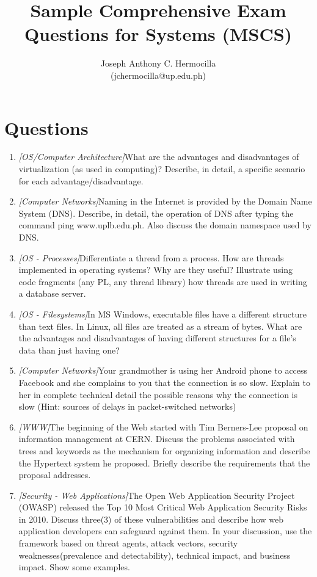 \documentclass{article}
\title{Sample Comprehensive Exam Questions for Systems (MSCS)}
\author{Joseph Anthony C. Hermocilla \\ (jchermocilla@up.edu.ph)}
\begin{document}
	\maketitle

	\section*{Questions}
	\begin{enumerate}
  	\item {\textit{[OS/Computer Architecture]}What are the advantages and disadvantages of virtualization (as used in computing)? Describe, in detail, a specific scenario for each advantage/disadvantage.}

	\item{\textit{[Computer Networks]}Naming in the Internet is provided by the Domain Name System (DNS). Describe, in detail, the operation of DNS after typing the command ping www.uplb.edu.ph. Also discuss the domain namespace used by DNS.}
  	
  	\item {\textit{[OS - Processes]}Differentiate a thread from a process. How are threads implemented in operating systems? Why are they useful? Illustrate using code fragments (any PL, any thread library) how threads are used in writing a database server.}
  	
  	\item {\textit{[OS - Filesystems]}In MS Windows, executable files have a different structure than text files. In Linux, all files are treated as a stream of bytes. What are the advantages and disadvantages of having different structures for a file's data than just having one?}
  	
  	\item{\textit{[Computer Networks]}Your grandmother is using her Android phone to access Facebook and she complains to you that the connection is so slow. Explain to her in complete technical detail the possible reasons why the connection is slow (Hint: sources of delays in packet-switched networks)}
  	
  	\item{\textit{[WWW]}The beginning of the Web started with Tim Berners-Lee proposal on information management at CERN. Discuss the problems associated with trees and keywords as the mechanism for organizing information and describe the Hypertext system he proposed. Briefly describe the requirements that the proposal addresses.}
  	
	\item {\textit{[Security - Web Applications]}The Open Web Application Security Project (OWASP)  released the Top 10 Most Critical Web Application Security Risks in 2010. Discuss three(3) of these vulnerabilities and describe how web application developers can safeguard against them. In your discussion, use the framework based on threat agents,  attack vectors, security weaknesses(prevalence and detectability), technical impact, and business impact. Show some examples.} 	
  	

\end{enumerate}
\end{document}

